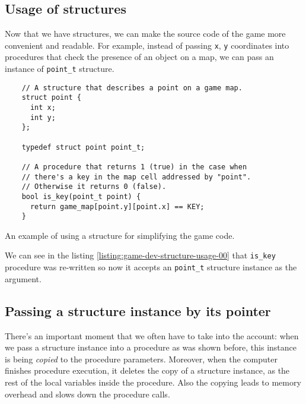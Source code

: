 \documentclass[../sparc.tex]{subfiles}
\begin{document}
\subsection{Usage of structures}

Now that we have structures, we can make the source code of the game more
convenient and readable.  For example, instead of passing \texttt{x},
\texttt{y} coordinates into procedures that check the presence of an
object on a map, we can pass an instance of \texttt{point_t} structure.

\begin{listing}[H]
  \begin{verbatim}
    // A structure that describes a point on a game map.
    struct point {
      int x;
      int y;
    };

    typedef struct point point_t;

    // A procedure that returns 1 (true) in the case when
    // there's a key in the map cell addressed by "point".
    // Otherwise it returns 0 (false).
    bool is_key(point_t point) {
      return game_map[point.y][point.x] == KEY;
    }
  \end{verbatim}
  \caption{An example of using a structure for simplifying the game code.}
  \label{listing:game-dev-structure-usage-00}
\end{listing}

We can see in the listing \ref{listing:game-dev-structure-usage-00} that
\texttt{is_key} procedure was re-written so now it accepts an
\texttt{point_t} structure instance as the argument.

\subsection{Passing a structure instance by its pointer}

There's an important moment that we often have to take into the account: when we
pass a structure instance into a procedure as was shown before, this instance is
being \emph{copied} to the procedure parameters.  Moreover, when the computer
finishes procedure execution, it deletes the copy of a structure instance, as
the rest of the local variables inside the procedure.  Also the copying leads to
memory overhead and slows down the procedure calls.
\end{document}
